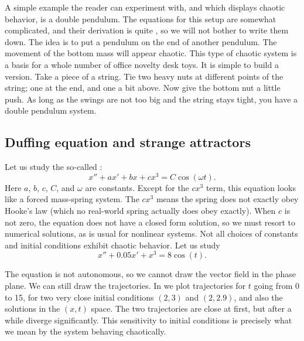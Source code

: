 \documentclass{ximera}
\begin{document}
\begin{mywrapfigsimp}{0.95in}{1.25in}
    \noindent
    
\end{mywrapfigsimp}
A simple example the reader can experiment with, and which displays chaotic behavior, is a double pendulum.  The equations for this setup are somewhat complicated, and their derivation is quite , so we will not bother to write them down.  The idea is to put a pendulum on the end of another pendulum.  The movement of the bottom mass will appear chaotic.  This type of chaotic system is a basis for a whole number of office novelty desk toys.  It is simple to build a version.  Take a piece of a string.  Tie two heavy nuts at different points of the string; one at the end, and one a bit above.  Now give the bottom nut a little push.  As long as the swings are not too big and the string stays tight, you have a double pendulum system.

\subsection{Duffing equation and strange attractors}

Let us study the so-called \emph{}:
\begin{equation*}
    x'' + a x' + bx + cx^3 = C \cos(\omega t) .
\end{equation*}
Here $a$, $b$, $c$, $C$, and $\omega$ are constants. Except for the $c x^3$ term, this equation looks like a forced mass-spring system.  The $c x^3$ means the spring does not exactly obey Hooke's law (which no real-world spring actually does obey exactly).  When $c$ is not zero, the equation does not have a closed form solution, so we must resort to numerical solutions, as is usual for nonlinear systems.  Not all choices of constants and initial conditions exhibit chaotic behavior.  Let us study
\begin{equation*}
    x''+0.05 x' + x^3 = 8\cos(t) .
\end{equation*}

The equation is not autonomous, so we cannot draw the vector field in the phase plane. We can still draw the trajectories. In  we plot trajectories for $t$ going from 0 to 15, for two very close initial conditions $(2,3)$ and $(2,2.9)$, and also the solutions in the $(x,t)$ space.  The two trajectories are close at first, but after a while diverge significantly. This sensitivity to initial conditions is precisely what we mean by the system behaving chaotically.
\end{document}
